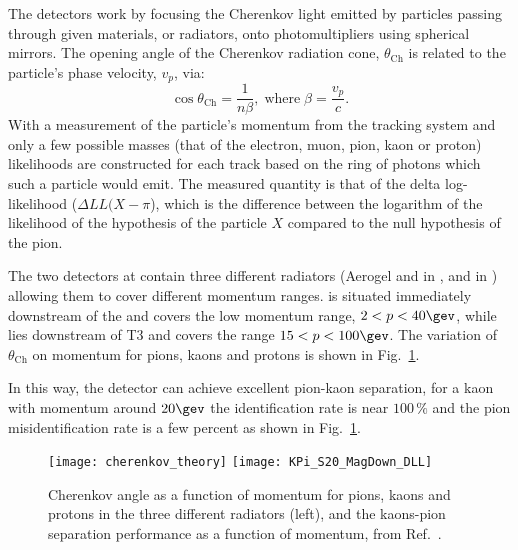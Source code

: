 The \rich detectors work by focusing the Cherenkov light emitted by particles passing through
given materials, or radiators, onto photomultipliers using spherical mirrors.
The opening angle of the Cherenkov radiation cone, $\theta_\mathrm{Ch}$ is related to the
particle's phase velocity, $v_p$, via:
\begin{equation}
  \cos\theta_\mathrm{Ch}=\frac1{n\beta},\mathrm{\;where\;} \beta=\frac{v_p}{c}.
\end{equation}
With a measurement of the particle's momentum from the tracking system and only a few possible
masses (that of the electron, muon, pion, kaon or proton) likelihoods are constructed for each
track based on the ring of photons which such a particle would emit.
The measured quantity is that of the delta log-likelihood ($\Delta LL(X-\pi$), which is the difference between the
logarithm of the likelihood of the hypothesis of the particle $X$ compared to the null hypothesis of the
pion.

The two \rich detectors at \lhcb contain three different radiators (Aerogel and \cfourften in
\richone, and \cffour in \richtwo) allowing them to cover different momentum ranges.
\richone is situated immediately downstream of the \velo and covers the low momentum range,
$2<p<40\gev$, while \richtwo lies downstream of T3 and covers the range $15<p<100\gev$.
The variation of $\theta_\mathrm{Ch}$ on momentum for pions, kaons and protons is shown in
Fig.~\ref{fig:lhcb:pideff}.

In this way, the \lhcb detector can achieve excellent pion-kaon separation, for a kaon with
momentum around $20\gev$ the identification rate is near $100\,\%$ and the pion misidentification
rate is a few percent as shown in Fig.~\ref{fig:lhcb:pideff}.

\begin{figure}
  \begin{center}
    \texttt{[image: cherenkov\_theory]}
    \texttt{[image: KPi\_S20\_MagDown\_DLL]}
  \end{center}
  \caption[Particle identification and Cherenkov angles]
  {\small
    Cherenkov angle as a function of momentum for pions, kaons and protons in the three different
    radiators (left), and the kaons-pion separation performance as a function of momentum, from
    Ref.~\cite{LHCb-DP-2012-003}.
  }
  \label{fig:lhcb:pideff}
\end{figure}

